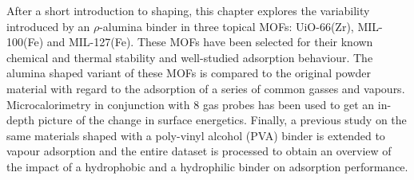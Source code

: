 After a short introduction to shaping, this chapter explores the 
variability introduced by an \( \rho \)-alumina binder in three 
topical MOFs: UiO-66(Zr), MIL-100(Fe) and MIL-127(Fe). These MOFs 
have been selected for their known chemical and thermal stability 
and well-studied adsorption behaviour.
The alumina shaped variant of these MOFs is compared to the original
powder material with regard to the adsorption of a series of common
gasses and vapours. Microcalorimetry in conjunction with 8 gas probes
has been used to get an in-depth picture of the change in surface
energetics.
Finally, a previous study on the same materials shaped with a poly-vinyl
alcohol (PVA) binder is extended to vapour adsorption and the entire
dataset is processed to obtain an overview of the impact of a
hydrophobic and a hydrophilic binder on adsorption performance.
